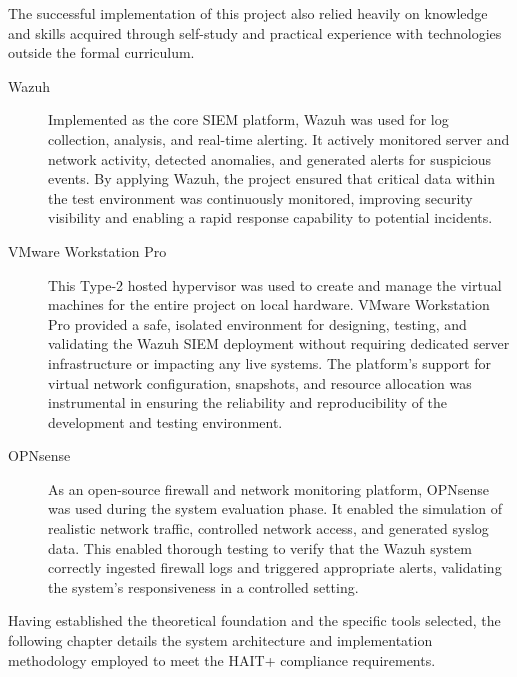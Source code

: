 \label{sec:extracurricular-knowledge}

The successful implementation of this project also relied heavily on knowledge and skills acquired through self-study and practical experience with technologies outside the formal curriculum.


\begin{description}
    \item[Wazuh] Implemented as the core SIEM platform, Wazuh was used for log collection, analysis, and real-time alerting. It actively monitored server and network activity, detected anomalies, and generated alerts for suspicious events. By applying Wazuh, the project ensured that critical data within the test environment was continuously monitored, improving security visibility and enabling a rapid response capability to potential incidents.

    \item[VMware Workstation Pro] This Type-2 hosted hypervisor was used to create and manage the virtual machines for the entire project on local hardware. VMware Workstation Pro provided a safe, isolated environment for designing, testing, and validating the Wazuh SIEM deployment without requiring dedicated server infrastructure or impacting any live systems. The platform's support for virtual network configuration, snapshots, and resource allocation was instrumental in ensuring the reliability and reproducibility of the development and testing environment.

    \item[OPNsense] As an open-source firewall and network monitoring platform, OPNsense was used during the system evaluation phase. It enabled the simulation of realistic network traffic, controlled network access, and generated syslog data. This enabled thorough testing to verify that the Wazuh system correctly ingested firewall logs and triggered appropriate alerts, validating the system’s responsiveness in a controlled setting.
\end{description}

Having established the theoretical foundation and the specific tools selected,
the following chapter details the system architecture and implementation
methodology employed to meet the HAIT+ compliance requirements.